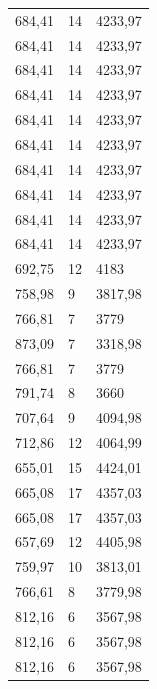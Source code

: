 \begin{center}
\begin{longtable}{|l|l|l|}
684,41            & 14               & 4233,97        \\
684,41            & 14               & 4233,97        \\
684,41            & 14               & 4233,97        \\
684,41            & 14               & 4233,97        \\
684,41            & 14               & 4233,97        \\
684,41            & 14               & 4233,97        \\
684,41            & 14               & 4233,97        \\
684,41            & 14               & 4233,97        \\
684,41            & 14               & 4233,97        \\
684,41            & 14               & 4233,97        \\
692,75            & 12               & 4183           \\
758,98            & 9                & 3817,98        \\
766,81            & 7                & 3779           \\
873,09            & 7                & 3318,98        \\
766,81            & 7                & 3779           \\
791,74            & 8                & 3660           \\
707,64            & 9                & 4094,98        \\
712,86            & 12               & 4064,99        \\
655,01            & 15               & 4424,01        \\
665,08            & 17               & 4357,03        \\
665,08            & 17               & 4357,03        \\
657,69            & 12               & 4405,98        \\
759,97            & 10               & 3813,01        \\
766,61            & 8                & 3779,98        \\
812,16            & 6                & 3567,98        \\
812,16            & 6                & 3567,98        \\
812,16            & 6                & 3567,98        \\

\end{longtable}
\end{center}
